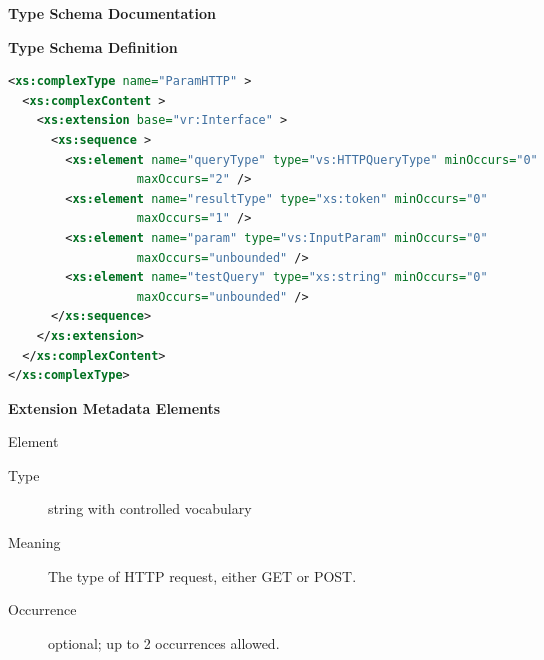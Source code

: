 \documentclass[11pt,a4paper]{ivoa}
\begin{document}
\begin{generated}
\begingroup
      	\renewcommand*\descriptionlabel[1]{%
      	\hbox to 5.5em{\emph{#1}\hfil}}\vspace{2ex}\noindent\textbf{ Type Schema Documentation}



\vspace{1ex}\noindent\textbf{ Type Schema Definition}

\begin{lstlisting}[language=XML,basicstyle=\footnotesize]
<xs:complexType name="ParamHTTP" >
  <xs:complexContent >
    <xs:extension base="vr:Interface" >
      <xs:sequence >
        <xs:element name="queryType" type="vs:HTTPQueryType" minOccurs="0"
                  maxOccurs="2" />
        <xs:element name="resultType" type="xs:token" minOccurs="0"
                  maxOccurs="1" />
        <xs:element name="param" type="vs:InputParam" minOccurs="0"
                  maxOccurs="unbounded" />
        <xs:element name="testQuery" type="xs:string" minOccurs="0"
                  maxOccurs="unbounded" />
      </xs:sequence>
    </xs:extension>
  </xs:complexContent>
</xs:complexType>
\end{lstlisting}

\vspace{0.5ex}\noindent\textbf{ Extension Metadata Elements}

\begingroup\small\begin{bigdescription}\item[Element \xmlel{queryType}]
\begin{description}
\item[Type] string with controlled vocabulary
\item[Meaning] 
                       The type of HTTP request, either GET or POST.
                     
\item[Occurrence] optional; up to 2 occurrences allowed.


\end{description}
\end{bigdescription}
\end{generated}
\end{document}
